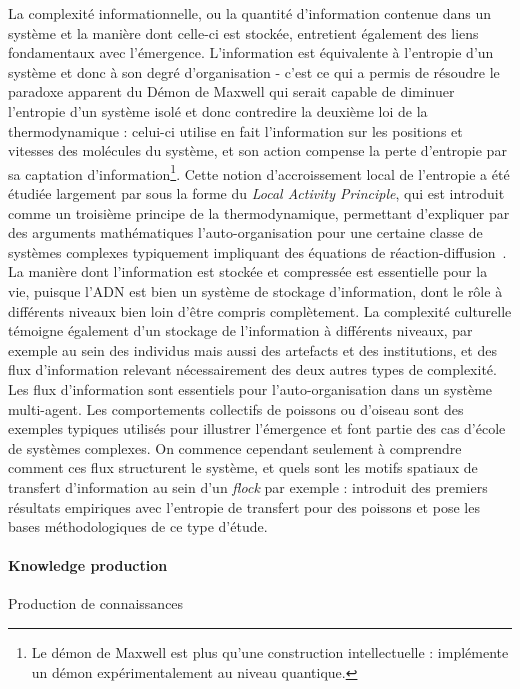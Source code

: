 La complexité informationnelle, ou la quantité d'information contenue dans un système et la manière dont celle-ci est stockée, entretient également des liens fondamentaux avec l'émergence. L'information est équivalente à l'entropie d'un système et donc à son degré d'organisation - c'est ce qui a permis de résoudre le paradoxe apparent du Démon de Maxwell qui serait capable de diminuer l'entropie d'un système isolé et donc contredire la deuxième loi de la thermodynamique : celui-ci utilise en fait l'information sur les positions et vitesses des molécules du système, et son action compense la perte d'entropie par sa captation d'information\footnote{Le démon de Maxwell est plus qu'une construction intellectuelle : \cite{cottet2017observing} implémente un démon expérimentalement au niveau quantique.}. Cette notion d'accroissement local de l'entropie a été étudiée largement par  sous la forme du \emph{Local Activity Principle}, qui est introduit comme un troisième principe de la thermodynamique, permettant d'expliquer par des arguments mathématiques l'auto-organisation pour une certaine classe de systèmes complexes typiquement impliquant des équations de réaction-diffusion~\cite{mainzer2013local}. La manière dont l'information est stockée et compressée est essentielle pour la vie, puisque l'ADN est bien un système de stockage d'information, dont le rôle à différents niveaux bien loin d'être compris complètement. La complexité culturelle témoigne également d'un stockage de l'information à différents niveaux, par exemple au sein des individus mais aussi des artefacts et des institutions, et des flux d'information relevant nécessairement des deux autres types de complexité. Les flux d'information sont essentiels pour l'auto-organisation dans un système multi-agent. Les comportements collectifs de poissons ou d'oiseau sont des exemples typiques utilisés pour illustrer l'émergence et font partie des cas d'école de systèmes complexes. On commence cependant seulement à comprendre comment ces flux structurent le système, et quels sont les motifs spatiaux de transfert d'information au sein d'un \emph{flock} par exemple : \cite{crosato2017informative} introduit des premiers résultats empiriques avec l'entropie de transfert pour des poissons et pose les bases méthodologiques de ce type d'étude.




\paragraph{Knowledge production}{Production de connaissances}

